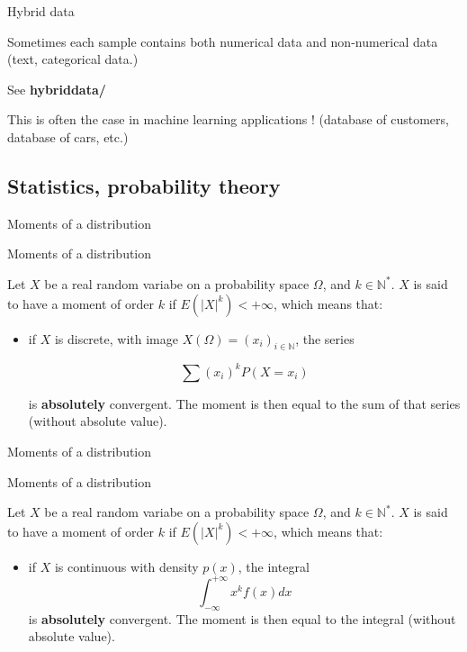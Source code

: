 \documentclass[usenames,dvipsnames]{beamer}
\begin{document}
\begin{frame}{Hybrid data}

    Sometimes each sample contains both numerical data and non-numerical data (text, categorical data.)

    See \textbf{hybrid\textunderscore data/}

    This is often the case in machine learning applications ! (database of customers, database of cars, etc.)

\end{frame}



\subsection{Statistics, probability theory}%
\label{sub:statistics_probability_theory}

\begin{frame}{Moments of a distribution}
\begin{definition}{Moments of a distribution}

    Let $X$ be a real random variabe on a probability space $\Omega$, and $k\in \mathbb{N}^*$. $X$ is said to have a moment of order $k$ if $E(|X|^k)<+\infty$, which means that:
    \begin{itemize}
	\item if $X$ is discrete, with image $X(\Omega)=(x_i)_{i\in \mathbb{N} }$, the series

	    \begin{equation*}
		\sum (x_i)^kP(X=x_i)
	    \end{equation*}

	    is \textbf{{absolutely}}  convergent. The moment is then equal to the sum of that series (without absolute value).
    \end{itemize}
\end{definition}
\end{frame}


\begin{frame}{Moments of a distribution}
\begin{definition}{Moments of a distribution}

    Let $X$ be a real random variabe on a probability space $\Omega$, and $k\in \mathbb{N}^*$. $X$ is said to have a moment of order $k$ if $E(|X|^k)<+\infty$, which means that:
    \begin{itemize}
	\item if $X$ is continuous with density $p(x)$, the integral
	    \begin{equation*}
	        \int^{+\infty}_{-\infty} x^kf(x)  dx 
	    \end{equation*}
	    is \textbf{{absolutely}}  convergent. The moment is then equal to the integral (without absolute value).
    \end{itemize}
\end{definition}
\end{frame}
\end{document}
